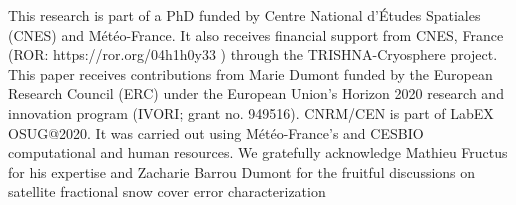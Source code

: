 \documentclass[tc, manuscript]{copernicus}
\begin{document}
\noappendix       %













\begin{acknowledgements}
This research is part of a PhD funded by Centre National d’Études Spatiales (CNES) and Météo-France. It also receives financial support from CNES, France (ROR: https://ror.org/04h1h0y33 ) through the TRISHNA-Cryosphere project. This paper receives contributions from Marie Dumont funded by the European Research Council (ERC) under the European Union’s Horizon 2020 research and innovation program (IVORI; grant no. 949516).
CNRM/CEN is part of LabEX OSUG@2020. It was carried out using Météo-France’s and CESBIO computational and human resources. We gratefully acknowledge Mathieu Fructus for his expertise and Zacharie Barrou Dumont for the fruitful discussions on satellite fractional snow cover error characterization
\end{acknowledgements}







\end{document}
